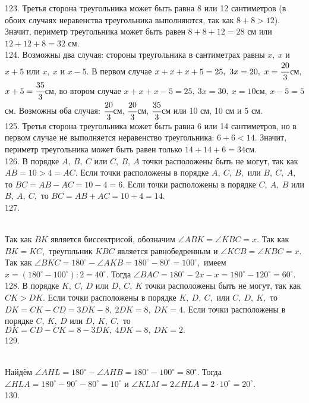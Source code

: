 123. Третья сторона треугольника может быть равна 8 или 12 сантиметров (в обоих случаях неравенства треугольника выполняются, так как $8+8>12$). Значит, периметр треугольника может быть равен $8+8+12=28$ см или $12+12+8=32$ см.\\
124. Возможны два случая: стороны треугольника в сантиметрах равны $x,\ x$ и $x+5$ или $x,\ x$ и $x-5.$ В первом случае $x+x+x+5=25,\ 3x=20,\ x=\cfrac{20}{3}$см, $x+5=\cfrac{35}{3}$см, во втором случае $x+x+x-5=25,\ 3x=30,\ x=10$см, $x-5=5$см. Возможны оба случая: $\cfrac{20}{3}$см, $\cfrac{20}{3}$см, $\cfrac{35}{3}$см или 10 см, 10 см и 5 см.\\
125. Третья сторона треугольника может быть равна 6 или 14 сантиметров, но в первом случае не выполняется неравенство треугольника: $6+6<14.$ Значит, периметр треугольника может быть равен только $14+14+6=34$см.\\
126. В порядке $A,\ B,\ C$ или $C,\ B,\ A$ точки расположены быть не могут, так как $AB=10>4=AC.$ Если точки расположены в порядке $A,\ C,\ B,$ или $B,\ C,\ A,$ то $BC=AB-AC=10-4=6.$ Если точки расположены в порядке $C,\ A,\ B$ или $B,\ A,\ C,$ то $BC=AB+AC=10+4=14.$\\
127. \begin{figure}[ht!]
\end{figure}\\
Так как $BK$ является биссектрисой, обозначим $\angle ABK=\angle KBC=x.$ Так как $BK=KC,$ треугольник $KBC$ является равнобедренным и $\angle KCB=\angle KBC=x.$ Так как $\angle BKC=180^\circ-\angle AKB=180^\circ-80^\circ=100^\circ,$ имеем $x=(180^\circ-100^\circ):2=40^\circ.$ Тогда $\angle BAC=180^\circ-2x-x=180^\circ-120^\circ=60^\circ.$\\
128. В порядке $K,\ C,\ D$ или $D,\ C,\ K$ точки расположены быть не могут, так как $CK>DK.$ Если точки расположены в порядке $K,\ D,\ C,$ или $C,\ D,\ K,$ то $DK=CK-CD=3DK-8,\ 2DK=8,\ DK=4.$ Если точки расположены в порядке $C,\ K,\ D$ или $D,\ K,\ C,$ то $DK=CD-CK=8-3DK,\ 4DK=8,\ DK=2.$\\
129. \begin{figure}[ht!]
\end{figure}\\
Найдём $\angle AHL=180^\circ-\angle AHB=180^\circ-100^\circ=80^\circ.$ Тогда $\angle HLA=180^\circ-90^\circ-80^\circ=10^\circ$ и $\angle KLM=2\angle HLA=2\cdot10^\circ=20^\circ.$\\
130. \begin{figure}[ht!]
\end{figure}\\
